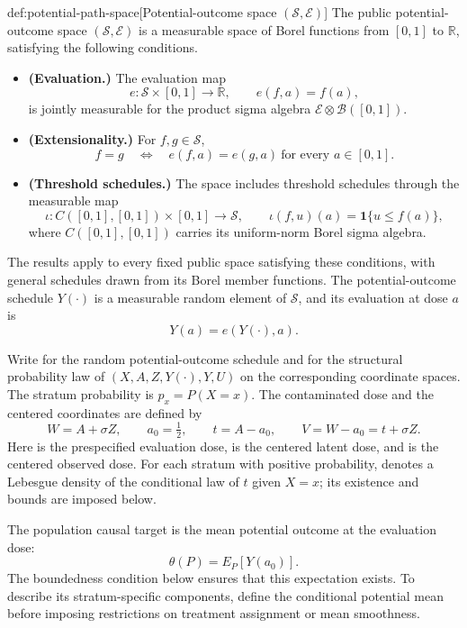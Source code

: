 \documentclass[11pt]{article}
\begin{document}
\begin{definitionv}{def:potential-path-space}[Potential-outcome space \((\mathcal S,\mathcal E)\)]
The public potential-outcome space \((\mathcal S,\mathcal E)\) is a measurable space of Borel functions from \([0,1]\) to \(\mathbb R\), satisfying the following conditions.
\begin{itemize}
\item \textbf{(Evaluation.)} The evaluation map
\[
e:\mathcal S\times[0,1]\longrightarrow\mathbb R,
\qquad e(f,a)=f(a),
\]
is jointly measurable for the product sigma algebra \(\mathcal E\otimes\mathcal B([0,1])\).
\item \textbf{(Extensionality.)} For \(f,g\in\mathcal S\),
\[
f=g
\quad\Longleftrightarrow\quad
e(f,a)=e(g,a)\ \text{for every }a\in[0,1].
\]
\item \textbf{(Threshold schedules.)} The space includes threshold schedules through the measurable map
\[
\iota:C([0,1],[0,1])\times[0,1]\longrightarrow\mathcal S,
\qquad
\iota(f,u)(a)=\mathbf1\{u\le f(a)\},
\]
where \(C([0,1],[0,1])\) carries its uniform-norm Borel sigma algebra.
\end{itemize}
The results apply to every fixed public space satisfying these conditions, with general schedules drawn from its Borel member functions. The potential-outcome schedule \(Y(\cdot)\) is a measurable random element of \(\mathcal S\), and its evaluation at dose \(a\) is
\[
Y(a)=e(Y(\cdot),a).
\]
\end{definitionv}

Write  for the random potential-outcome schedule and  for the structural probability law of \((X,A,Z,Y(\cdot),Y,U)\) on the corresponding coordinate spaces. The stratum probability  is \(p_x=P(X=x)\). The contaminated dose  and the centered coordinates are defined by
\[
W=A+\sigma Z,
\qquad
a_0=\tfrac12,
\qquad
t=A-a_0,
\qquad
V=W-a_0=t+\sigma Z.
\]
Here  is the prespecified evaluation dose,  is the centered latent dose, and  is the centered observed dose. For each stratum with positive probability,  denotes a Lebesgue density of the conditional law of \(t\) given \(X=x\); its existence and bounds are imposed below.

The population causal target  is the mean potential outcome at the evaluation dose:
\[
\theta(P)=E_P[Y(a_0)].
\]
The boundedness condition below ensures that this expectation exists. To describe its stratum-specific components, define the conditional potential mean  before imposing restrictions on treatment assignment or mean smoothness.
\end{document}
